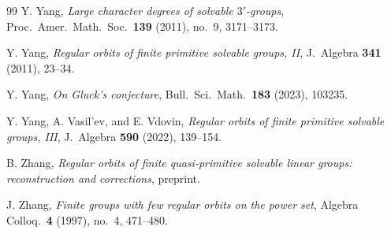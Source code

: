 \documentclass[10pt]{amsart}
\theoremstyle{definition}
\numberwithin{equation}{section}
\numberwithin{table}{section}
\begin{document}
\begin{thebibliography}{99}
Y. Yang,
{\it Large character degrees of solvable $3'$-groups},
Proc.\ Amer.\ Math.\ Soc.\ \textbf{139} (2011), no.~9, 3171--3173.

Y. Yang,
{\it Regular orbits of finite primitive solvable groups, II},
J.\ Algebra \textbf{341} (2011), 23--34.

Y. Yang,
{\it On Gluck's conjecture},
Bull.\ Sci.\ Math.\ \textbf{183} (2023), 103235.

Y. Yang, A. Vasil'ev, and E. Vdovin,
{\it Regular orbits of finite primitive solvable groups, III},
J.\ Algebra \textbf{590} (2022), 139--154.

B. Zhang,
{\it Regular orbits of finite quasi-primitive solvable linear groups:
reconstruction and corrections},
preprint.

J. Zhang,
{\it Finite groups with few regular orbits on the power set},
Algebra Colloq.\ \textbf{4} (1997), no.~4, 471--480.

\end{thebibliography}
\end{document}
